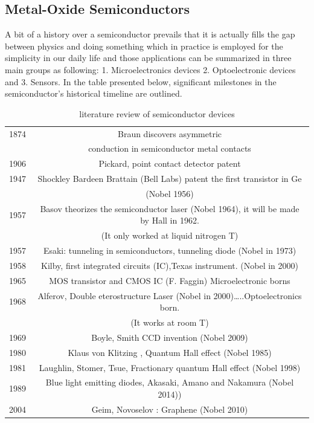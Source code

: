 \subsection{Metal-Oxide Semiconductors}
A bit of a history over a semiconductor prevails that it is actually fills the gap between physics and doing something which in practice is employed for the simplicity in our daily life and those applications can be summarized in three main groups as following: 1. Microelectronics devices 2. Optoelectronic devices and 3. Sensors. In the table presented below, significant milestones in the semiconductor's historical timeline are outlined.
\begin{table}[h]
\centering
\caption{literature review of semiconductor devices }
\begin{tabular}{|c|c|}
\hline
1874 & Braun discovers asymmetric\\ &conduction in semiconductor metal contacts\\
\hline
1906  & Pickard, point contact detector patent\\ 
\hline
1947  & Shockley Bardeen Brattain (Bell Labs) patent the first transistor in Ge\\ & (Nobel 1956)\\ 
\hline
1957  & Basov theorizes the semiconductor laser (Nobel 1964), it will be made by Hall in 1962.\\ & (It only worked at liquid nitrogen T)\\ 
\hline
1957  & Esaki: tunneling in semiconductors, tunneling diode (Nobel in 1973) \\ 
\hline
1958  &Kilby, first integrated circuits (IC),Texas instrument. (Nobel in 2000) \\ 
\hline
1965  & MOS transistor and CMOS IC (F. Faggin) Microelectronic borns \\ 
\hline
1968  &Alferov, Double eterostructure Laser (Nobel in 2000)…..Optoelectronics born.\\ & (It works at room T)\\ 
\hline
1969  & Boyle, Smith CCD invention (Nobel 2009)\\ 
\hline
1980  & Klaus von Klitzing , Quantum Hall effect (Nobel 1985)\\ 
\hline
1981  & Laughlin, Stomer, Tsue, Fractionary quantum Hall effect (Nobel 1998)\\ 
\hline
1989  & Blue light emitting diodes, Akasaki, Amano and Nakamura (Nobel 2014))\\ 
\hline
2004 & Geim, Novoselov : Graphene (Nobel 2010)\\ 
\hline
\end{tabular}
\label{tab:1}
\end{table}

